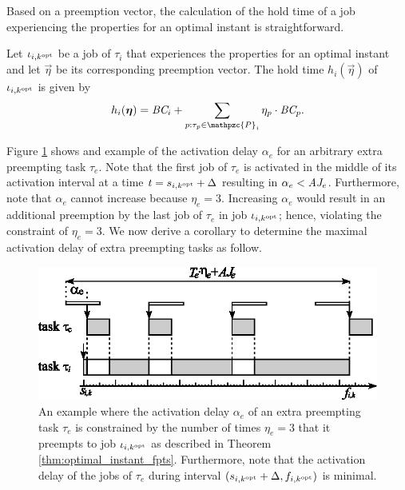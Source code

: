 Based on a preemption vector, the calculation of the hold time of a job experiencing the properties for an optimal instant is straightforward.

\begin{corollary}
Let $\iota_{i,k^{\rm{opt}}}$ be a job of $\tau_i$ that experiences the properties for an optimal instant and let $\vec{\eta}$ be its corresponding preemption vector. The hold time $h_i(\vec{\eta})$ of $\iota_{i,k^{\rm{opt}}}$ is given by
\begin{align}
	h_i(\vec{\eta})= \bc_i + \sum\limits_{p:\tau_p \in \mathpzc{P}_i} \eta_p \cdot \bc_p.
\end{align}
\end{corollary}


Figure \ref{fig:alpha_e} shows and example of the activation delay $\alpha_e$ for an arbitrary extra preempting task $\tau_e$. Note that the first job of $\tau_e$ is activated in the middle of its activation interval at a time $t=s_{i,k^{\rm{opt}}}+\Delta$ resulting in $\alpha_e < \mbox{\it AJ}_e$. Furthermore, note that $\alpha_e$ cannot increase because $\eta_e = 3$. Increasing $\alpha_e$ would result in an additional preemption by the last job of $\tau_e$ in job $\iota_{i,k^{\rm{opt}}}$; hence, violating the constraint of $\eta_e = 3$. We now derive a corollary to determine the maximal activation delay of extra preempting tasks as follow.

\begin{figure}[h]
	\centering
	\includegraphics[width=0.7\linewidth]{figures/alpha_e} 
	\caption{An example where the activation delay $\alpha_e$ of an extra preempting task $\tau_e$ is constrained by the number of times $\eta_e = 3$ that it preempts to job $\iota_{i,k^{\rm{opt}}}$ as described in Theorem \ref{thm:optimal_instant_fpts}. Furthermore, note that the activation delay of the jobs of $\tau_e$ during interval $(s_{i,k^{\rm{opt}}} + \Delta,f_{i,k^{\rm{opt}}})$ is minimal.}
	\label{fig:alpha_e}
\end{figure}


